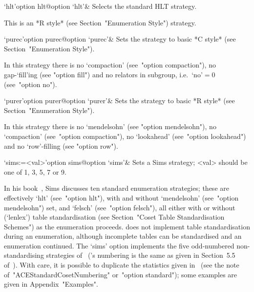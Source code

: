 \>`hlt'{option hlt}@{option `hlt'}&
Selects the standard HLT strategy.

This is an *R style* (see Section~"Enumeration Style") strategy.

\>`purec'{option purec}@{option `purec'}&
Sets the strategy to basic *C style* (see Section~"Enumeration  Style").

In this strategy there is no `compaction'  (see~"option  compaction"),
no gap-`fill'ing (see "option fill")  and  no  relators  in  subgroup,
i.e.~`no'${}=0$ (see~"option no").

\>`purer'{option purer}@{option `purer'}&
Sets the strategy  to basic *R style* (see Section~"Enumeration  Style").

In this strategy there is no `mendelsohn' (see  "option  mendelsohn"),
no `compaction' (see~"option compaction"), no `lookahead' (see~"option
lookahead") and no `row'-filling (see "option row").

\>`sims:=<val>'{option sims}@{option `sims'}&
Sets a Sims strategy; <val> should be one of 1, 3, 5, 7 or 9.

In his book~\cite{Sim94},  Sims  discusses  ten  standard  enumeration
strategies; these are effectively `hlt' (see~"option hlt"),  with  and
without  `mendelsohn'  (see~"option  mendelsohn")  set,  and  `felsch'
(see~"option felsch"), all either with  or  without  (`lenlex')  table
standardisation (see Section~"Coset Table Standardisation Schemes") as
the  enumeration   proceeds.   {\ACE}   does   not   implement   table
standardisation during an enumeration, although incomplete tables  can
be standardised  and  an  enumeration  continued.  The  `sims'  option
implements  the   five   odd-numbered   non-standardising   strategies
of~\cite{Sim94}  ({\ACE}'s  numbering  is  the  same   as   given   in
Section~5.5 of~\cite{Sim94}). With care, it is possible  to  duplicate
the    statistics    given    in~\cite{Sim94}    (see     the     note
of~"ACEStandardCosetNumbering" or~"option  standard");  some  examples
are given in Appendix~"Examples".

\enditems

